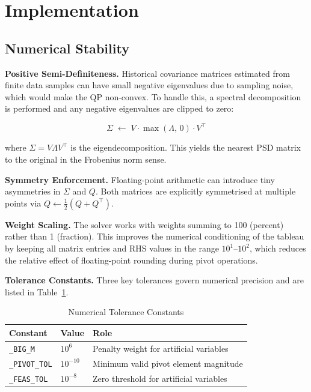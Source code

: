 \documentclass[conference]{IEEEtran}
\begin{document}
\section{Implementation}

\subsection{Numerical Stability}

\textbf{Positive Semi-Definiteness.}
Historical covariance matrices estimated from finite data samples can have
small negative eigenvalues due to sampling noise, which would make the QP
non-convex. To handle this, a spectral decomposition is performed and any
negative eigenvalues are clipped to zero:

\begin{equation}
    \Sigma \;\leftarrow\; V \cdot \max(\Lambda,\, 0) \cdot V^\top
    \label{eq:psd_clip}
\end{equation}

where $\Sigma = V \Lambda V^\top$ is the eigendecomposition. This yields
the nearest PSD matrix to the original in the Frobenius norm sense.

\textbf{Symmetry Enforcement.}
Floating-point arithmetic can introduce tiny asymmetries in $\Sigma$ and $Q$.
Both matrices are explicitly symmetrised at multiple points via
$Q \leftarrow \frac{1}{2}(Q + Q^\top)$.

\textbf{Weight Scaling.}
The solver works with weights summing to 100 (percent) rather than 1
(fraction). This improves the numerical conditioning of the tableau by keeping
all matrix entries and RHS values in the range $10^1$--$10^2$, which reduces
the relative effect of floating-point rounding during pivot operations.

\textbf{Tolerance Constants.}
Three key tolerances govern numerical precision and are listed in
Table~\ref{tab:tols}.

\begin{table}[h]
    \centering
    \caption{Numerical Tolerance Constants}
    \label{tab:tols}
    \begin{tabular}{lll}
        \toprule
        \textbf{Constant} & \textbf{Value} & \textbf{Role} \\
        \midrule
        \texttt{\_BIG\_M}     & $10^6$    & Penalty weight for artificial variables \\
        \texttt{\_PIVOT\_TOL} & $10^{-10}$ & Minimum valid pivot element magnitude \\
        \texttt{\_FEAS\_TOL}  & $10^{-8}$  & Zero threshold for artificial variables \\
        \bottomrule
    \end{tabular}
\end{table}
\end{document}
